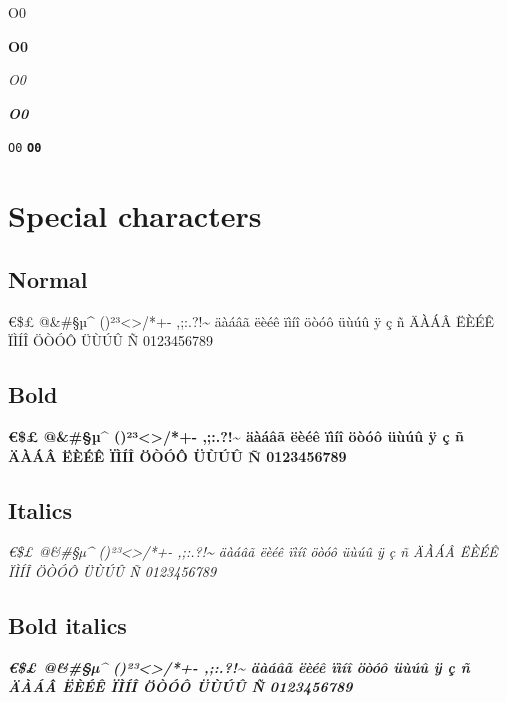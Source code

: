 \documentclass[twoside]{extreport}
\begin{document}
\begin{description}
\tightlist
\item[normal:]
O0
\item[bold:]
\textbf{O0}
\item[italics:]
\emph{O0}
\item[bold italics:]
\textbf{\emph{O0}}
\item[fix width font:]
\texttt{O0} \textbf{\texttt{O0}}
\end{description}

\hypertarget{special-characters}{%
\section{Special characters}\label{special-characters}}

\hypertarget{normal-1}{%
\subsection{Normal}\label{normal-1}}

€\$£ @\&\#§µ\^{} (){}\textbar²³\textless\textgreater/*+-
,;:.?!\textasciitilde{} äàáâã ëèéê ïìíî öòóô üùúû ÿ ç ñ ÄÀÁÂ ËÈÉÊ ÏÌÍÎ
ÖÒÓÔ ÜÙÚÛ Ñ 0123456789

\hypertarget{bold}{%
\subsection{Bold}\label{bold}}

\textbf{€\$£ @\&\#§µ\^{} (){}\textbar²³\textless\textgreater/*+-
,;:.?!\textasciitilde{} äàáâã ëèéê ïìíî öòóô üùúû ÿ ç ñ ÄÀÁÂ ËÈÉÊ ÏÌÍÎ
ÖÒÓÔ ÜÙÚÛ Ñ 0123456789}

\hypertarget{italics}{%
\subsection{Italics}\label{italics}}

\emph{€\$£ @\&\#§µ\^{} (){}\textbar²³\textless\textgreater/*+-
,;:.?!\textasciitilde{} äàáâã ëèéê ïìíî öòóô üùúû ÿ ç ñ ÄÀÁÂ ËÈÉÊ ÏÌÍÎ
ÖÒÓÔ ÜÙÚÛ Ñ 0123456789}

\hypertarget{bold-italics}{%
\subsection{Bold italics}\label{bold-italics}}

\textbf{\emph{€\$£ @\&\#§µ\^{} (){}\textbar²³\textless\textgreater/*+-
,;:.?!\textasciitilde{} äàáâã ëèéê ïìíî öòóô üùúû ÿ ç ñ ÄÀÁÂ ËÈÉÊ ÏÌÍÎ
ÖÒÓÔ ÜÙÚÛ Ñ 0123456789}}
\end{document}
